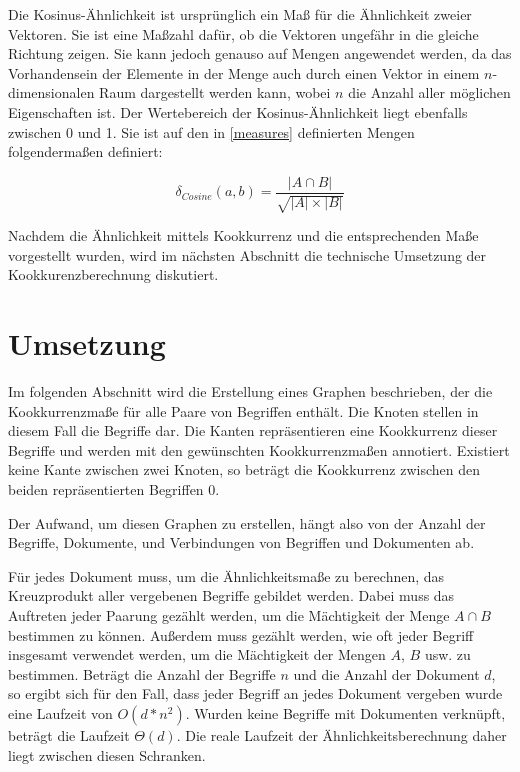 Die Kosinus-Ähnlichkeit \cite{hkp2012} ist ursprünglich ein Maß für die Ähnlichkeit zweier Vektoren. Sie ist eine Maßzahl dafür, ob die Vektoren ungefähr in die gleiche Richtung zeigen. Sie kann jedoch genauso auf Mengen angewendet werden, da das Vorhandensein der Elemente in der Menge auch durch einen Vektor in einem \(n\)-dimensionalen Raum dargestellt werden kann, wobei \(n\) die Anzahl aller möglichen Eigenschaften ist. Der Wertebereich der Kosinus-Ähnlichkeit liegt ebenfalls zwischen \num{0} und \num{1}. Sie ist auf den in \ref{measures} definierten Mengen folgendermaßen definiert:

\[
\delta_{Cosine}(a, b) = \frac{|A \cap B|}{\sqrt{|A| \times |B|}}
\]

Nachdem die Ähnlichkeit mittels Kookkurrenz und die entsprechenden Maße vorgestellt wurden, wird im nächsten Abschnitt die technische Umsetzung der Kookkurenzberechnung diskutiert.

\section{Umsetzung}

Im folgenden Abschnitt wird die Erstellung eines Graphen beschrieben, der die Kookkurrenzmaße für alle Paare von Begriffen enthält. Die Knoten stellen in diesem Fall die Begriffe dar. Die Kanten repräsentieren eine Kookkurrenz dieser Begriffe und werden mit den gewünschten Kookkurrenzmaßen annotiert. Existiert keine Kante zwischen zwei Knoten, so beträgt die Kookkurrenz zwischen den beiden repräsentierten Begriffen \num{0}.

Der Aufwand, um diesen Graphen zu erstellen, hängt also von der Anzahl der Begriffe, Dokumente, und Verbindungen von Begriffen und Dokumenten ab.

Für jedes Dokument muss, um die Ähnlichkeitsmaße zu berechnen, das Kreuzprodukt aller vergebenen Begriffe gebildet werden. Dabei muss das Auftreten jeder Paarung gezählt werden, um die Mächtigkeit der Menge \(A \cap B\) bestimmen zu können. Außerdem muss gezählt werden, wie oft jeder Begriff insgesamt verwendet werden, um die Mächtigkeit der Mengen \(A\), \(B\) usw. zu bestimmen. Beträgt die Anzahl der Begriffe \(n\) und die Anzahl der Dokument \(d\), so ergibt sich für den Fall, dass jeder Begriff an jedes Dokument vergeben wurde eine Laufzeit von \(O(d*n^2)\). Wurden keine Begriffe mit Dokumenten verknüpft, beträgt die Laufzeit \(\Theta(d)\). Die reale Laufzeit der Ähnlichkeitsberechnung daher liegt zwischen diesen Schranken.


